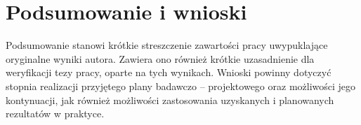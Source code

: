 \section{Podsumowanie i wnioski}
\label{sec:podsumowanie-wnioski}
Podsumowanie stanowi krótkie streszczenie zawartości pracy uwypuklające oryginalne wyniki autora. Zawiera ono również krótkie uzasadnienie dla weryfikacji tezy pracy, oparte na tych wynikach. Wnioski powinny dotyczyć stopnia realizacji przyjętego plany badawczo – projektowego oraz możliwości jego kontynuacji, jak również możliwości zastosowania uzyskanych i planowanych rezultatów w praktyce.
